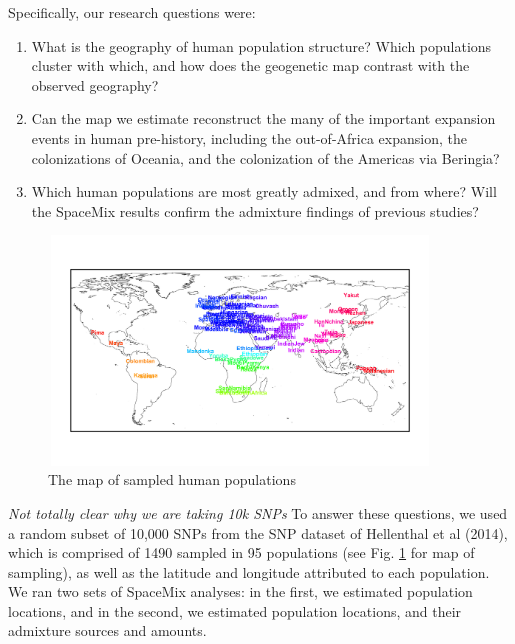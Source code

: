 \documentclass[12pt]{article}
\newcommand{\gc}[1]{{\em \color{blue} #1}}
\begin{document}
Specifically, our research questions were: 
\begin{enumerate}
\item What is the geography of human population structure?  Which populations cluster with which, and how does the geogenetic map contrast with the observed geography?
\item Can the map we estimate reconstruct the many of the important expansion events in human pre-history, including the out-of-Africa expansion, the colonizations of Oceania, and the colonization of the Americas via Beringia?
\item Which human populations are most greatly admixed, and from where?  Will the SpaceMix results confirm the admixture findings of previous studies?
\end{enumerate}

\begin{figure}
	\centering
	\includegraphics[width=4in,height=2.4in]{figs/globetrotter/globe_world_map_text.png}
	\caption{The map of sampled human populations}\label{globe_world_map}
\end{figure}

\gc{Not totally clear why we are taking 10k SNPs}
To answer these questions, we used a random subset of 10,000 SNPs from the SNP dataset of Hellenthal et al (2014), which is comprised of 1490 sampled in 95 populations (see Fig. \ref{globe_world_map} for map of sampling), as well as the latitude and longitude attributed to each population.  We ran two sets of SpaceMix analyses: in the first, we estimated population locations, and in the second, we estimated population locations, and their admixture sources and amounts.
\end{document}
